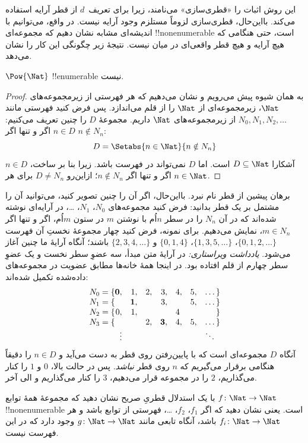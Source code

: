 \documentclass[../../../include/open-logic-section]{subfiles}
\begin{document}
\begin{explain}
این روش اثبات را «قطری‌سازی» می‌نامند، زیرا برای تعریف~$d$ از قطر آرایه
استفاده می‌کند. بااین‌حال، قطری‌سازی لزوماً مستلزم وجود آرایه نیست. در
واقع، می‌توانیم با اندیشه‌ای مشابه نشان دهیم که مجموعه‌ای
!!{nonenumerable} است، حتی هنگامی که هیچ آرایه و هیچ قطر واقعی‌ای در
میان نیست. نتیجهٔ زیر چگونگی این کار را نشان می‌دهد.
\end{explain}

\begin{thm}
$\Pow{\Nat}$ !!{enumerable} نیست.
\end{thm}

\begin{proof}
به همان شیوه پیش می‌رویم و نشان می‌دهیم که هر فهرستی از زیرمجموعه‌های
~$\Nat$، زیرمجموعه‌ای از $\Nat$ را از قلم می‌اندازد. پس فرض کنید فهرستی
مانند $N_0, N_1, N_2, \ldots$ از زیرمجموعه‌های $\Nat$ داریم. مجموعهٔ
$D$ را چنین تعریف می‌کنیم: $n \in D$ اگر و تنها اگر $n \notin N_{n}$:
\[
D = \Setabs{n \in \Nat}{n \notin N_n}
\]
آشکارا $D\subseteq \Nat$ است. اما $D$ نمی‌تواند در فهرست باشد. زیرا بنا بر
ساخت، $n \in D$ اگر و تنها اگر $n\notin N_n$؛ ازاین‌رو $D \neq N_n$
برای هر $n \in \Nat$.
\end{proof}

\begin{explain}
برهان پیشین از قطر نام نبرد. بااین‌حال، اگر آن را چنین تصویر کنید،
می‌توانید آن را مشتمل بر یک قطر بدانید: فرض کنید مجموعه‌های $N_0$،
$N_1$، \dots، در آرایه‌ای نوشته شده‌اند که در آن $N_n$ را در سطر $n$اُم
با نوشتن $m$ در ستون $m$اُم، اگر و تنها اگر $m \in N_n$، نمایش می‌دهیم.
برای نمونه، فرض کنید چهار مجموعهٔ نخستِ آن فهرست
$\{0,1,2,\dots\}$، $\{1, 3, 5, \dots\}$، $\{0,1,4\}$ و
$\{2,3,4,\dots\}$ باشند؛ آنگاه آرایهٔ ما چنین آغاز می‌شود.
\emph{یادداشت ویراستاری:} در آرایهٔ متن مبدأ، سه عضوِ سطر نخست و یک
عضوِ سطر چهارم از قلم افتاده بود. در اینجا همهٔ خانه‌ها مطابق عضویت در
مجموعه‌های داده‌شده تکمیل شده‌اند:
\[
\begin{array}{r@{}rrrrrrr}
  N_0 = \{ & \mathbf{0}, & 1, & 2, & 3, & 4, & 5, & \dots\}\\
  N_1 = \{ &  & \mathbf{1}, &  & 3, &  & 5, & \dots\}\\
  N_2 = \{ & 0, & 1, &  &  & 4\phantom{,} &  & \}\\
  N_3 = \{ &  &  & 2, & \mathbf{3}, & 4, & 5, & \dots\}\\
  &\vdots & & & & & & \ddots\phantom{\}}
  \end{array}
\]
آنگاه $D$ مجموعه‌ای است که با پایین‌رفتن روی قطر به دست می‌آید و $n
\in D$ را دقیقاً هنگامی برقرار می‌گیریم که $n$ روی قطر \emph{نباشد}.
پس در حالت بالا، $0$ و $1$ را کنار می‌گذاریم، $2$ را در مجموعه قرار
می‌دهیم، $3$ را کنار می‌گذاریم و الی آخر.
\end{explain}

\begin{prob}
با یک استدلال قطریِ صریح نشان دهید که مجموعهٔ همهٔ توابع
$f \colon \Nat \to \Nat$ !!{nonenumerable} است. یعنی نشان دهید که اگر
$f_1$، $f_2$، \dots، فهرستی از توابع باشد و هر $f_i\colon
\Nat \to \Nat$ باشد، آنگاه تابعی مانند $g \colon \Nat \to
\Nat$ وجود دارد که در این فهرست نیست.
\end{prob}
\end{document}
